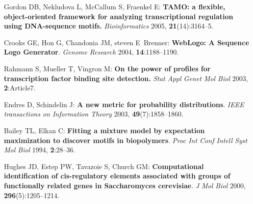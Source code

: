 \documentclass{article}
\begin{document}
\begin{thebibliography}{10}

Gordon DB, Nekludova L, McCallum S, Fraenkel E: \textbf{TAMO: a flexible,
  object-oriented framework for analyzing transcriptional regulation using
  DNA-sequence motifs.} \emph{Bioinformatics} 2005, \textbf{21}(14):3164--5.

Crooks GE, Hon G, Chandonia JM, steven E~Brenner: \textbf{WebLogo: A Sequence
  Logo Generator}. \emph{Genome Research} 2004, \textbf{14}:1188--1190.

Rahmann S, Mueller T, Vingron M: \textbf{On the power of profiles for
  transcription factor binding site detection.} \emph{Stat Appl Genet Mol Biol}
  2003, \textbf{2}:Article7.

Endres D, Schindelin J: \textbf{A new metric for probability distributions}.
  \emph{IEEE transactions on Information Theory} 2003,
  \textbf{49}(7):1858--1860.

Bailey TL, Elkan C: \textbf{{Fitting a mixture model by expectation
  maximization to discover motifs in biopolymers}}. \emph{Proc Int Conf Intell
  Syst Mol Biol} 1994, \textbf{2}:28--36.

Hughes JD, Estep PW, Tavazoie S, Church GM: \textbf{{Computational
  identification of cis-regulatory elements associated with groups of
  functionally related genes in Saccharomyces cerevisiae}}. \emph{J Mol Biol}
  2000, \textbf{296}(5):1205--1214.

\end{thebibliography}
\end{document}
